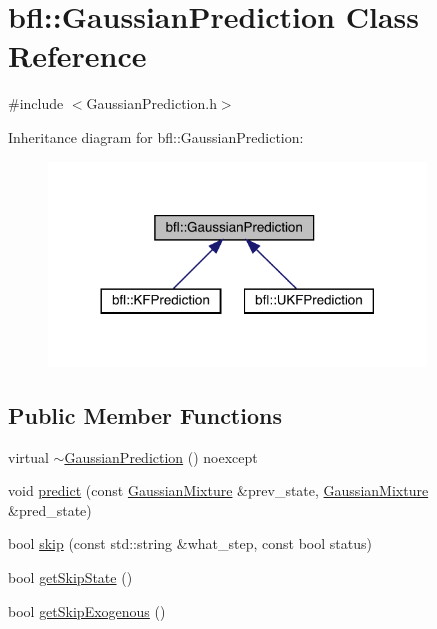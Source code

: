 \hypertarget{classbfl_1_1GaussianPrediction}{}\section{bfl\+:\+:Gaussian\+Prediction Class Reference}
\label{classbfl_1_1GaussianPrediction}


{\ttfamily \#include $<$Gaussian\+Prediction.\+h$>$}



Inheritance diagram for bfl\+:\+:Gaussian\+Prediction\+:
\nopagebreak
\begin{figure}[H]
\begin{center}
\leavevmode
\includegraphics[width=284pt]{classbfl_1_1GaussianPrediction__inherit__graph}
\end{center}
\end{figure}
\subsection*{Public Member Functions}
\begin{DoxyCompactItemize}
\item 
virtual \mbox{\hyperlink{classbfl_1_1GaussianPrediction_a940d6b50429f758b4e085b9b77918a0d}{$\sim$\+Gaussian\+Prediction}} () noexcept
\item 
void \mbox{\hyperlink{classbfl_1_1GaussianPrediction_a37195b6f9a8799ac3d357500b8142676}{predict}} (const \mbox{\hyperlink{classbfl_1_1GaussianMixture}{Gaussian\+Mixture}} \&prev\+\_\+state, \mbox{\hyperlink{classbfl_1_1GaussianMixture}{Gaussian\+Mixture}} \&pred\+\_\+state)
\item 
bool \mbox{\hyperlink{classbfl_1_1GaussianPrediction_ae647821cf920ea81f981ebc9260cdbe6}{skip}} (const std\+::string \&what\+\_\+step, const bool status)
\item 
bool \mbox{\hyperlink{classbfl_1_1GaussianPrediction_a6885530a677199241b2ac11ccdb09688}{get\+Skip\+State}} ()
\item 
bool \mbox{\hyperlink{classbfl_1_1GaussianPrediction_aaf3743111a493b90092b7ead9cbf7825}{get\+Skip\+Exogenous}} ()
\end{DoxyCompactItemize}

